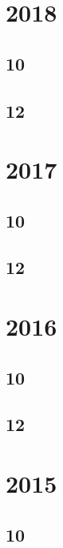 \documentclass[11pt]{book}
\begin{document}
\section{2018}
\subsection{10}


\subsection{12}



\section{2017}
\subsection{10}

\subsection{12}




\section{2016}
\subsection{10}

\subsection{12}

\section{2015}
\subsection{10}


%
%
%
\end{document}
